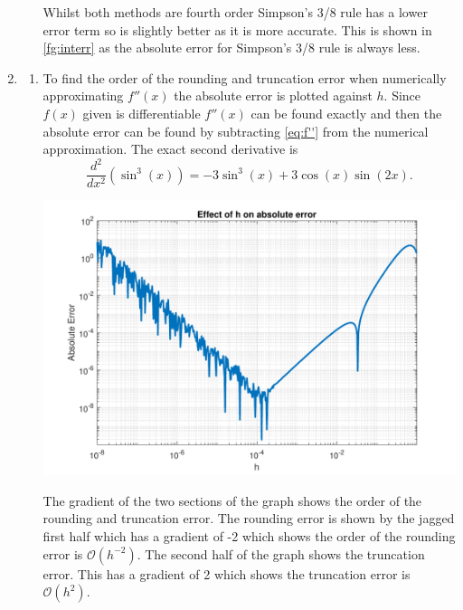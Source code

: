 \documentclass[a4paper,11pt]{article}
\begin{document}
\begin{enumerate}
\begin{enumerate}
		Whilst both methods are fourth order Simpson's 3/8 rule has a lower 
		error term so is slightly better as it is more accurate. This is 
		shown in \autoref{fg:interr} as the absolute error for Simpson's 
		3/8 rule is always less.
	\end{enumerate}

	
	\item \begin{enumerate}
		\item To find the order of the rounding and truncation error when 
		numerically approximating $f''(x)$ the absolute error is plotted 
		against $h$. Since $f(x)$ given is differentiable 
		$f''(x)$ can be found exactly and then the absolute error can be 
		found by subtracting \autoref{eq:f''} from the numerical 
		approximation. The exact second derivative is
		\begin{equation}
			\frac{d^{2}}{dx^{2}}(\sin^{3}(x)) = -3\sin^{3}(x) + 
			3\cos(x)\sin(2x).
			\label{eq:f''}
		\end{equation}
		\begin{center}
			\includegraphics[scale=0.7]{images/Q2bi.pdf}
		\end{center}
		The gradient of the two sections of the graph shows the order of the 
		rounding and truncation error. The rounding error is shown by the 
		jagged first half which has a gradient of -2 which shows the order of 
		the rounding error is $\mathcal{O}(h^{-2})$. The second half of the 
		graph shows the truncation error. This has a gradient of 2 which 
		shows the truncation error is $\mathcal{O}(h^{2})$.
		

\end{enumerate}
\end{enumerate}
\end{document}
